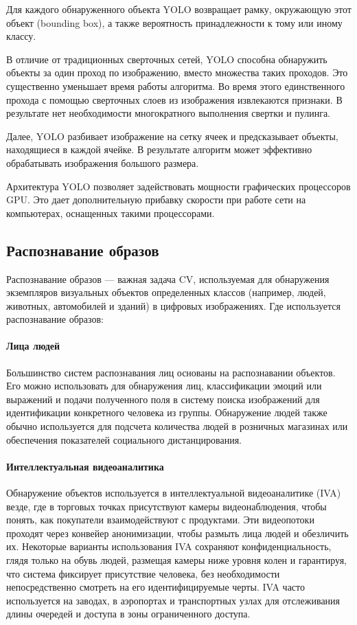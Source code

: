 Для каждого обнаруженного объекта YOLO возвращает рамку, окружающую этот объект (bounding box), а также вероятность принадлежности к тому или иному классу.

В отличие от традиционных сверточных сетей, YOLO способна обнаружить объекты за один проход по изображению, вместо множества таких проходов. Это существенно уменьшает время работы алгоритма. Во время этого единственного прохода с помощью сверточных слоев из изображения извлекаются признаки. В результате нет необходимости многократного выполнения свертки и пулинга.

Далее, YOLO разбивает изображение на сетку ячеек и предсказывает объекты, находящиеся в каждой ячейке. В результате алгоритм может эффективно обрабатывать изображения большого размера.

Архитектура YOLO позволяет задействовать мощности графических процессоров GPU. Это дает дополнительную прибавку скорости при работе сети на компьютерах, оснащенных такими процессорами.

\subsection{Распознавание образов}

Распознавание образов — важная задача CV, используемая для обнаружения экземпляров визуальных объектов определенных классов (например, людей, животных, автомобилей и зданий) в цифровых изображениях.
Где используется распознавание образов:

\paragraph{Лица людей}
Большинство систем распознавания лиц основаны на распознавании объектов. Его можно использовать для обнаружения лиц, классификации эмоций или выражений и подачи полученного поля в систему поиска изображений для идентификации конкретного человека из группы.
Обнаружение людей также обычно используется для подсчета количества людей в розничных магазинах или обеспечения показателей социального дистанцирования.

\paragraph{Интеллектуальная видеоаналитика} Обнаружение объектов используется в интеллектуальной видеоаналитике (IVA) везде, где в торговых точках присутствуют камеры видеонаблюдения, чтобы понять, как покупатели взаимодействуют с продуктами. Эти видеопотоки проходят через конвейер анонимизации, чтобы размыть лица людей и обезличить их. Некоторые варианты использования IVA сохраняют конфиденциальность, глядя только на обувь людей, размещая камеры ниже уровня колен и гарантируя, что система фиксирует присутствие человека, без необходимости непосредственно смотреть на его идентифицируемые черты. IVA часто используется на заводах, в аэропортах и транспортных узлах для отслеживания длины очередей и доступа в зоны ограниченного доступа.

